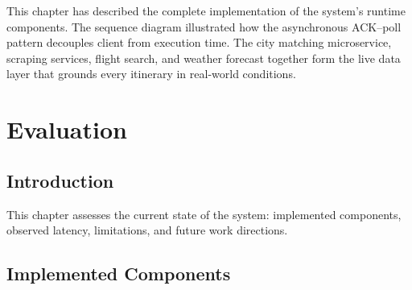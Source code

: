 \documentclass[12pt,a4paper]{report}
\begin{document}
This chapter has described the complete implementation of the system's runtime components. The
sequence diagram illustrated how the asynchronous ACK--poll pattern decouples client from execution
time. The city matching microservice, scraping services, flight search, and weather forecast together
form the live data layer that grounds every itinerary in real-world conditions.

\chapter{Evaluation}

\section*{Introduction}

This chapter assesses the current state of the system: implemented components, observed latency,
limitations, and future work directions.

\section{Implemented Components}
\end{document}
